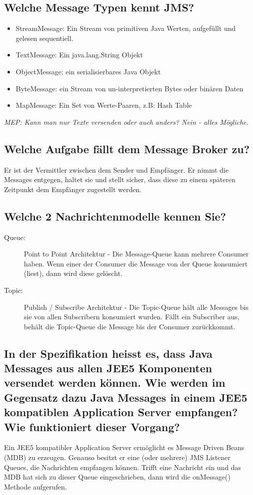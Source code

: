 \subsection{Welche Message Typen kennt JMS?}
\begin{itemize}
	\item StreamMessage: Ein Stream von primitiven Java Werten, aufgefüllt und gelesen sequentiell.
	\item TextMessage: Ein java.lang.String Objekt
	\item ObjectMessage: ein serialisierbares Java Objekt
	\item ByteMessage: ein Stream von un-interpretierten Bytes oder binären Daten
	\item MapMessage: Ein Set von Werte-Paaren, z.B: Hash Table
\end{itemize}
\emph{MEP: Kann man nur Texte versenden oder auch anders? Nein - alles Mögliche.}

\subsection{Welche Aufgabe fällt dem Message Broker zu?}
Er ist der Vermittler zwischen dem Sender und Empfänger. Er nimmt die Messages entgegen, haltet sie und stellt sicher, dass diese zu einem späteren Zeitpunkt dem Empfänger zugestellt werden.

\subsection{Welche 2 Nachrichtenmodelle kennen Sie?}
\begin{description}
	\item[Queue:] Point to Point Architektur - Die Message-Queue kann mehrere Consumer haben. Wenn einer der Consumer die Message von der Queue konsumiert (liest), dann wird diese gelöscht.
	\item[Topic:] Publish / Subscribe Architektur - Die Topic-Queue hält alle Messages bis sie von allen Subscribern konsumiert wurden. Fällt ein Subscriber aus, behält die Topic-Queue die Message bis der Consumer zurückkommt.
\end{description}

\subsection{In der Spezifikation heisst es, dass Java Messages aus allen JEE5 Komponenten versendet werden können. Wie werden im Gegensatz dazu Java Messages in einem JEE5 kompatiblen Application Server empfangen? Wie funktioniert dieser Vorgang?}
Ein JEE5 kompatibler Application Server ermöglicht es Message Driven Beans (MDB) zu erzeugen. Genauso besitzt er eine (oder mehrere) JMS Listener Queues, die Nachrichten empfangen können. Trifft eine Nachricht ein und das MDB hat sich zu dieser Queue eingeschrieben, dann wird die onMessage() Methode aufgerufen.

